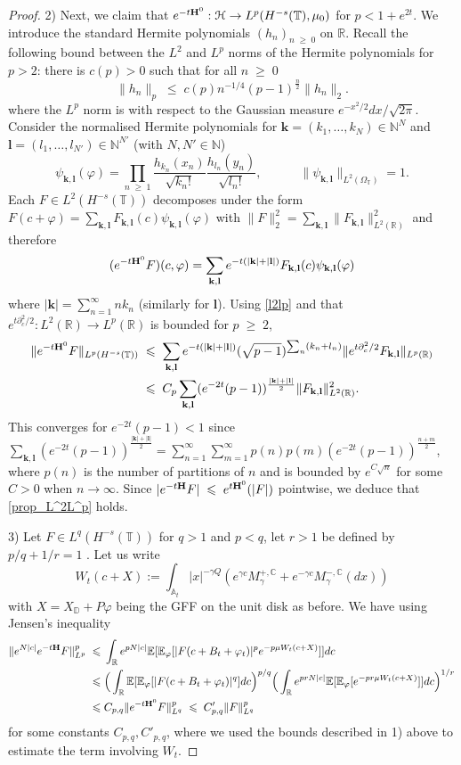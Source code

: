 \documentclass[11pt]{amsart}
\numberwithin{equation}{section}
\theoremstyle{definition}
\renewcommand{\leq}{\;\leqslant\;}                   %
\renewcommand{\geq}{\;\geqslant\;}                   %
\newcommand{\C}{\mathbb{C}}
\newcommand{\A}{\mathbb{A}}
\newcommand{\D}{\mathbb{D}}
\newcommand{\R}{\mathbb{R}}
\newcommand{\N}{\mathbb{N}}
\def\l{\mathbf{l}}
\def\k{\mathbf{k}}
\def\E{\mathbb{E}}
\newcommand{\pl}{\partial}
\newcommand{\mc}{\mathcal}
\def\T{\mathbb{T}}
\begin{document}
\begin{proof}
2) Next, we claim that $e^{-t{\bf H}^0}:\mc{H}\to L^p(H^{-s}(\T),\mu_0)$ for $p<1+e^{2t}$. 
We introduce the standard Hermite polynomials $(h_n)_{n \geq 0}$ on $\R$. Recall the following bound between the $L^2$ and $L^p$ norms of the Hermite polynomials for $p>2$: there is $c(p)>0$ such that for all $n\geq 0$
\begin{equation}\label{l2lp}
\|  h_n \|_p \leq c(p) n^{-1/4} (p-1)^{\frac{n}{2}} \|h_n \|_{2}.
\end{equation}
where the $L^p$ norm is with respect to the Gaussian measure $e^{-x^2/2}dx/\sqrt{2\pi}$. Consider  the normalised Hermite polynomials
for $\k=(k_1,\dots,k_N)\in \N^{N}$ and $\l=(l_1,\dots,l_{N'})\in \N^{N'}$ (with $N,N'\in \N$)
\[
\psi_{ \k, \l }(\varphi)= \prod_{n \geq 1}  \frac{h_{k_n}(x_n)}{\sqrt{k_n!}}\frac{h_{l_n}(y_n)}{\sqrt{l_n!}}, \quad  \quad  \quad    \|\psi_{ \k, \l }\|_{L^2(\Omega_\T)}=1.
\]
Each $F \in L^2(H^{-s}(\T))$ decomposes under the form 
$F(c+\varphi)=\sum_{\k,\l}F_{ \k, \l }(c)\psi_{\k,\l}(\varphi)$ with $\|F\|_2^2=\sum_{\k,\l}\|F_{\k,\l}\|_{L^2(\R)}^2$
and therefore
\begin{equation*}
(e^{-t {\bf H}^0}F)(c,\varphi)=\sum_{\k,\l}e^{-t(|\k|+|\l|)}F_{\k,\l}(c)\psi_{\k,\l}(\varphi)
\end{equation*}
where $| \k |= \sum_{n=1}^{\infty} n k_n$ (similarly for $\l$). Using \eqref{l2lp} and that $e^{t\pl_c^2/2}:L^2(\R)\to L^p(\R)$ is bounded for $p\geq 2$,
\begin{align*}
\| e^{-t {\bf H}^0} F \|_{L^p(H^{-s}(\T))} & \leq   \sum_{ \k, \l } e^{-t  (|\k|+|\l|)}  (\sqrt{p-1})^{\sum_n (k_n+l_n)}   \|  e^{t\pl_c^2/2}F_{ \k, \l } \|_{L^p(\R)}  \\
&  \leq C_p   \sum_{ \k, \l } (e^{-2t}(p-1))^{\frac{|\k|+|\l|}2}    \| F_{ \k, \l } \|^2_{L^2(\R)}. 
\end{align*}
This converges for $e^{-2t}(p-1)<1$ since $\sum_{ \k, \l }  (e^{-2t}(p-1))^{\frac{|\k|+|\l|}2}= \sum_{n=1}^{\infty} \sum_{m=1}^\infty p(n) p(m) (e^{-2t}(p-1))^{\frac{n+m}2 }$, 
where $p(n)$ is the number of partitions of $n$ and is bounded by $e^{C \sqrt{n}}$ for some $C>0$ when $n\to \infty$. 
Since $|e^{-t{\bf H}}F|\leq e^{t{\bf H}^0}(|F|)$ pointwise, we deduce that \eqref{prop_L^2L^p} holds.

3) Let $F\in L^q(H^{-s}(\T))$ for $q>1$ and $p<q$, let $r>1$ be defined by $p/q+1/r=1$ . Let us write 
\[W_t(c+X):=\int_{\A_t}|x|^{-\gamma Q}(e^{\gamma c}M_\gamma^{+,\C}+e^{-\gamma c}M^{-,\C}_\gamma(dx))\]
with $X=X_\D+P\varphi$ being the GFF on the unit disk as before.
We have using Jensen's inequality
\[\begin{split}
\|e^{N|c|}e^{-t{\bf H}}F\|_{L^p}^p \leq & \int_{\R} e^{pN|c|}\E[ \E_\varphi[|F(c+B_t+\varphi_t)|^pe^{-p\mu W_t(c+X)}]]dc\\
\leq & \Big(\int_{\R} \E[ \E_\varphi[|F(c+B_t+\varphi_t)|^{q}]dc \Big)^{p/q} \Big(\int_{\R}  e^{prN|c|}\E[\E_\varphi[e^{-pr\mu W_t(c+X)}]]dc\Big)^{1/r}\\
\leq & C_{p,q}\|e^{-t{\bf H}^0}F\|^{p}_{L^{q}}\leq  C'_{p,q}\|F\|^{p}_{L^{q}}
\end{split}
\]
for some constants $C_{p,q},C'_{p,q}$, where we used the bounds described in 1) above to estimate the term involving $W_t$.
\end{proof}
\end{document}
